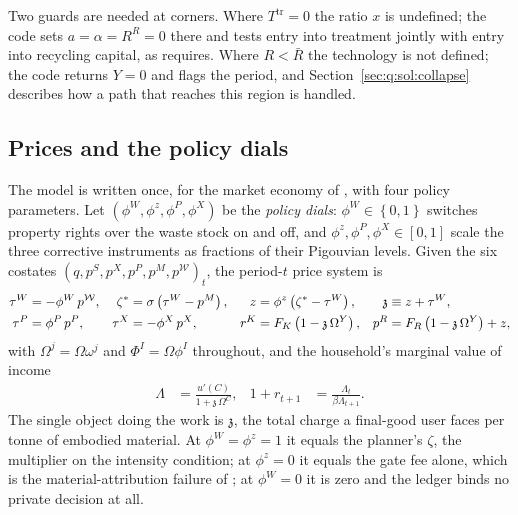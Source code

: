 Two guards are needed at corners. Where $T^{\mathrm{tr}}=0$ the ratio $x$ is undefined; the code sets $a=\alpha=R^R=0$ there and tests entry into treatment jointly with entry into recycling capital, as  requires. Where $R<\bar R$ the technology is not defined; the code returns $Y=0$ and flags the period, and Section~\ref{sec:q:sol:collapse} describes how a path that reaches this region is handled.

\subsection{Prices and the policy dials}\label{sec:q:model:policy}

The model is written once, for the market economy of \theorynote{}, with four policy parameters. Let $\left(\phi^W,\phi^z,\phi^P,\phi^X\right)$ be the \emph{policy dials}: $\phi^W\in\left\{0,1\right\}$ switches property rights over the waste stock on and off, and $\phi^z,\phi^P,\phi^X\in\left[0,1\right]$ scale the three corrective instruments as fractions of their Pigouvian levels. Given the six costates $\left(q,p^S,p^X,p^P,p^M,p^{\mathcal W}\right)_t$, the period-$t$ price system is
\begin{align}
\tau^W &= -\phi^W\,p^{\mathcal W},
&
\zeta^{\ast} &= \sigma\left(\tau^W-p^M\right),
&
z &= \phi^z\left(\zeta^{\ast}-\tau^W\right),
&
\mathfrak z &\equiv z+\tau^W,
\notag\\
\tau^P &= \phi^P\,p^P,
&
\tau^X &= -\phi^X\,p^X,
&
r^K &= F_K\left(1-\mathfrak z\,\Omega^Y\right),
&
p^R &= F_R\left(1-\mathfrak z\,\Omega^Y\right)+z,
\label{eq:q:prices}
\end{align}
with $\Omega^j=\Omega\omega^j$ and $\Phi^I=\Omega\phi^I$ throughout, and the household's marginal value of income
\begin{align}
\Lambda &= \frac{u'\left(C\right)}{1+\mathfrak z\,\Omega^C},
&
1+r_{t+1} &= \frac{\Lambda_t}{\beta\Lambda_{t+1}} .
\label{eq:q:lambda}
\end{align}
The single object doing the work is $\mathfrak z$, the total charge a final-good user faces per tonne of embodied material. At $\phi^W=\phi^z=1$ it equals the planner's $\zeta$, the multiplier on the intensity condition; at $\phi^z=0$ it equals the gate fee alone, which is the material-attribution failure of ; at $\phi^W=0$ it is zero and the ledger binds no private decision at all.

